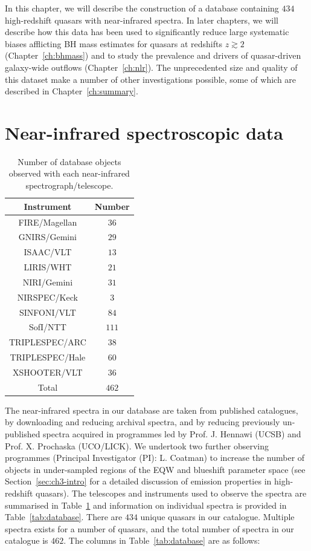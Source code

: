 In this chapter, we will describe the construction of a database containing $434$ high-redshift quasars with near-infrared spectra. 
In later chapters, we will describe how this data has been used to significantly reduce large systematic biases afflicting BH mass estimates for quasars at redshifts $z \gtrsim 2$ (Chapter~\ref{ch:bhmass}) and to study the prevalence and drivers of quasar-driven galaxy-wide outflows (Chapter~\ref{ch:nlr}). 
The unprecedented size and quality of this dataset make a number of other investigations possible, some of which are described in Chapter~\ref{ch:summary}. 

\section{Near-infrared spectroscopic data}

\begin{table}
  \footnotesize
  \centering
    \begin{tabular}{cc} 
    \hline
    Instrument & Number \\  
    \hline
    FIRE/Magellan   & $36$ \\
    GNIRS/Gemini    & $29$ \\
    ISAAC/VLT       & $13$  \\
    LIRIS/WHT       & $21$  \\
    NIRI/Gemini     & $31$ \\
    NIRSPEC/Keck    & $3$   \\ 
    SINFONI/VLT     & $84$ \\
    SofI/NTT        & $111$ \\
    TRIPLESPEC/ARC  & $38$ \\
    TRIPLESPEC/Hale & $60$ \\
    XSHOOTER/VLT    & $36$  \\
    \hline
    Total & $462$ \\
    \hline
    \end{tabular}
    \caption[{Number of database objects observed with each near-infrared spectrograph/telescope.}]{Number of database objects observed with each near-infrared spectrograph/telescope.}
  \label{tab:data_summary}
\end{table}

The near-infrared spectra in our database are taken from published catalogues, by downloading and reducing
archival spectra, and by reducing previously un-published spectra acquired in programmes led by Prof. J. Hennawi (UCSB) and Prof. X. Prochaska (UCO/LICK).
We undertook two further observing programmes (Principal Investigator (PI): L. Coatman) to increase the number of objects in under-sampled regions of the  EQW and blueshift parameter space (see Section~\ref{sec:ch3-intro} for a detailed discussion of  emission properties in high-redshift quasars).
The telescopes and instruments used to observe the spectra are summarised in Table~\ref{tab:data_summary} and information on individual spectra is provided in Table~\ref{tab:database}.
There are $434$ unique quasars in our catalogue. 
Multiple spectra exists for a number of quasars, and the total number of spectra in our catalogue is $462$. 
The columns in Table~\ref{tab:database} are as follows: 

